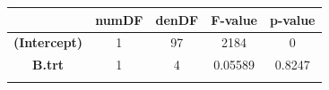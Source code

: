 \documentclass[]{article}
\begin{document}
\begin{longtable}[]{@{}ccccc@{}}
\toprule
\begin{minipage}[b]{0.29\columnwidth}\centering\strut
~\strut
\end{minipage} & \begin{minipage}[b]{0.10\columnwidth}\centering\strut
numDF\strut
\end{minipage} & \begin{minipage}[b]{0.10\columnwidth}\centering\strut
denDF\strut
\end{minipage} & \begin{minipage}[b]{0.12\columnwidth}\centering\strut
F-value\strut
\end{minipage} & \begin{minipage}[b]{0.12\columnwidth}\centering\strut
p-value\strut
\end{minipage}\tabularnewline
\midrule
\endhead
\begin{minipage}[t]{0.29\columnwidth}\centering\strut
\textbf{(Intercept)}\strut
\end{minipage} & \begin{minipage}[t]{0.10\columnwidth}\centering\strut
1\strut
\end{minipage} & \begin{minipage}[t]{0.10\columnwidth}\centering\strut
97\strut
\end{minipage} & \begin{minipage}[t]{0.12\columnwidth}\centering\strut
2184\strut
\end{minipage} & \begin{minipage}[t]{0.12\columnwidth}\centering\strut
0\strut
\end{minipage}\tabularnewline
\begin{minipage}[t]{0.29\columnwidth}\centering\strut
\textbf{B.trt}\strut
\end{minipage} & \begin{minipage}[t]{0.10\columnwidth}\centering\strut
1\strut
\end{minipage} & \begin{minipage}[t]{0.10\columnwidth}\centering\strut
4\strut
\end{minipage} & \begin{minipage}[t]{0.12\columnwidth}\centering\strut
0.05589\strut
\end{minipage} & \begin{minipage}[t]{0.12\columnwidth}\centering\strut
0.8247\strut
\end{minipage}\tabularnewline
\begin{minipage}[t]{0.29\columnwidth}\centering\strut

\end{minipage}
\end{longtable}
\end{document}
